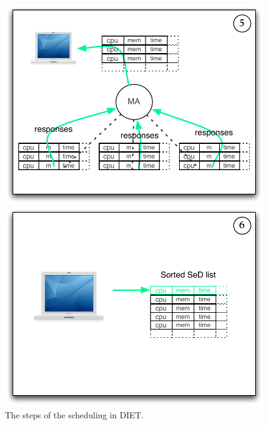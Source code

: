 \begin{figure}[h]
\begin{minipage}{\schdlFigWidth}
    \includegraphics[width=\schdlFigWidth]{fig/schdl04}
  \end{minipage}
  \begin{minipage}{\schdlFigWidth}
    \includegraphics[width=\schdlFigWidth]{fig/schdl05}
  \end{minipage}
  \caption{The steps of the scheduling in DIET.\label{scheduleSteps}}
\end{figure}

